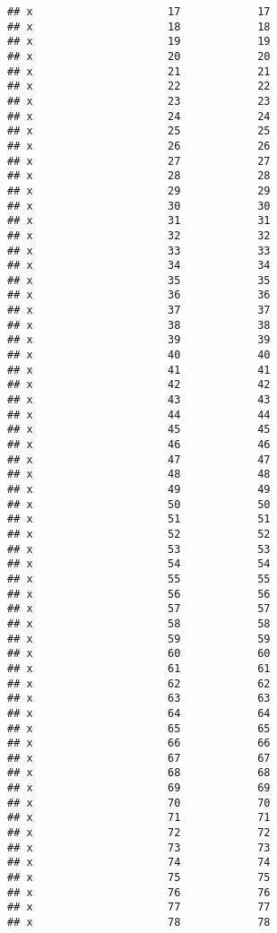 \documentclass[
]{article}
\begin{document}
\begin{verbatim}
## x                     17            17
## x                     18            18
## x                     19            19
## x                     20            20
## x                     21            21
## x                     22            22
## x                     23            23
## x                     24            24
## x                     25            25
## x                     26            26
## x                     27            27
## x                     28            28
## x                     29            29
## x                     30            30
## x                     31            31
## x                     32            32
## x                     33            33
## x                     34            34
## x                     35            35
## x                     36            36
## x                     37            37
## x                     38            38
## x                     39            39
## x                     40            40
## x                     41            41
## x                     42            42
## x                     43            43
## x                     44            44
## x                     45            45
## x                     46            46
## x                     47            47
## x                     48            48
## x                     49            49
## x                     50            50
## x                     51            51
## x                     52            52
## x                     53            53
## x                     54            54
## x                     55            55
## x                     56            56
## x                     57            57
## x                     58            58
## x                     59            59
## x                     60            60
## x                     61            61
## x                     62            62
## x                     63            63
## x                     64            64
## x                     65            65
## x                     66            66
## x                     67            67
## x                     68            68
## x                     69            69
## x                     70            70
## x                     71            71
## x                     72            72
## x                     73            73
## x                     74            74
## x                     75            75
## x                     76            76
## x                     77            77
## x                     78            78

\end{verbatim}
\end{document}
